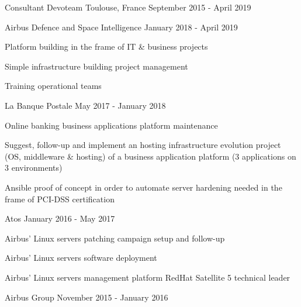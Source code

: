 \begin{cventries}
  \cventry
    {Consultant} %
    {Devoteam} %
    {Toulouse, France} %
    {September 2015 - April 2019} %
    {
      \begin{cvsubentries}
        \cvsubentry
          {}
          {Airbus Defence and Space Intelligence}
          {January 2018 - April 2019}
          {
            \begin{cvitems} %
              \item {Platform building in the frame of IT \& business projects}
              \item {Simple infrastructure building project management}
              \item {Training operational teams}
            \end{cvitems}
          }
        \cvsubentry
          {}
          {La Banque Postale}
          {May 2017 - January 2018}
          {
            \begin{cvitems} %
              \item {Online banking business applications platform maintenance}
              \item {Suggest, follow-up and implement an hosting infrastructure evolution project (OS, middleware \& hosting) of a business application platform (3 applications on 3 environments)}
              \item {Ansible proof of concept in order to automate server hardening needed in the frame of PCI-DSS certification}
            \end{cvitems}
          }
        \cvsubentry
          {}
          {Atos}
          {January 2016 - May 2017}
          {
            \begin{cvitems} %
              \item {Airbus' Linux servers patching campaign setup and follow-up}
              \item {Airbus' Linux servers software deployment}
              \item {Airbus' Linux servers management platform RedHat Satellite 5 technical leader}
            \end{cvitems}
          }
        \cvsubentry
          {}
          {Airbus Group}
          {November 2015 - January 2016}
          {
            \begin{cvitems} %

\end{cvitems}}
\end{cvsubentries}}
\end{cventries}
